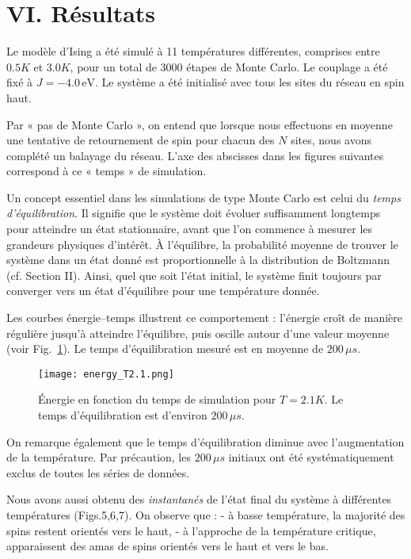 \documentclass[a4paper,11pt]{article}
\begin{document}
\section*{VI. Résultats}

Le modèle d’Ising a été simulé à 11 températures différentes, comprises entre $0.5K$ et $3.0K$, pour un total de $3000$ étapes de Monte Carlo. Le couplage a été fixé à $J = -4.0 \, \text{eV}$.  
Le système a été initialisé avec tous les sites du réseau en spin haut.  

Par « pas de Monte Carlo », on entend que lorsque nous effectuons en moyenne une tentative de retournement de spin pour chacun des $N$ sites, nous avons complété un balayage du réseau. L’axe des abscisses dans les figures suivantes correspond à ce « temps » de simulation.  

Un concept essentiel dans les simulations de type Monte Carlo est celui du \textit{temps d’équilibration}. Il signifie que le système doit évoluer suffisamment longtemps pour atteindre un état stationnaire, avant que l’on commence à mesurer les grandeurs physiques d’intérêt. À l’équilibre, la probabilité moyenne de trouver le système dans un état donné est proportionnelle à la distribution de Boltzmann (cf. Section II). Ainsi, quel que soit l’état initial, le système finit toujours par converger vers un état d’équilibre pour une température donnée.

Les courbes énergie–temps illustrent ce comportement : l’énergie croît de manière régulière jusqu’à atteindre l’équilibre, puis oscille autour d’une valeur moyenne (voir Fig.~\ref{fig:energyT2.1}).  
Le temps d’équilibration mesuré est en moyenne de $200 \, \mu s$.

\begin{figure}[H]
    \centering
    \texttt{[image: energy\_T2.1.png]}
    \caption{Énergie en fonction du temps de simulation pour $T = 2.1K$. Le temps d’équilibration est d’environ $200 \, \mu s$.}
    \label{fig:energyT2.1}
\end{figure}

On remarque également que le temps d’équilibration diminue avec l’augmentation de la température. Par précaution, les $200 \, \mu s$ initiaux ont été systématiquement exclus de toutes les séries de données.  

Nous avons aussi obtenu des \textit{instantanés} de l’état final du système à différentes températures (Figs.5,6,7). On observe que :  
- à basse température, la majorité des spins restent orientés vers le haut,  
- à l’approche de la température critique, apparaissent des amas de spins orientés vers le haut et vers le bas.  
\end{document}
